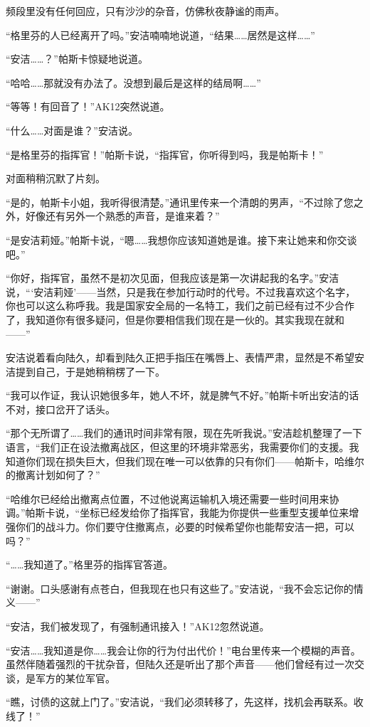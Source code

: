 频段里没有任何回应，只有沙沙的杂音，仿佛秋夜静谧的雨声。

“格里芬的人已经离开了吗。”安洁喃喃地说道，“结果……居然是这样……”

“安洁……？”帕斯卡惊疑地说道。

“哈哈……那就没有办法了。没想到最后是这样的结局啊……”

“等等！有回音了！”AK12突然说道。

“什么……对面是谁？”安洁说。

“是格里芬的指挥官！”帕斯卡说，“指挥官，你听得到吗，我是帕斯卡！”

对面稍稍沉默了片刻。

“是的，帕斯卡小姐，我听得很清楚。”通讯里传来一个清朗的男声，“不过除了您之外，好像还有另外一个熟悉的声音，是谁来着？”

“是安洁莉娅。”帕斯卡说，“嗯……我想你应该知道她是谁。接下来让她来和你交谈吧。”

“你好，指挥官，虽然不是初次见面，但我应该是第一次讲起我的名字。”安洁说，“‘安洁莉娅’——当然，只是我在参加行动时的代号。不过我喜欢这个名字，你也可以这么称呼我。我是国家安全局的一名特工，我们之前已经有过不少合作了，我知道你有很多疑问，但是你要相信我们现在是一伙的。其实我现在就和——”

安洁说着看向陆久，却看到陆久正把手指压在嘴唇上、表情严肃，显然是不希望安洁提到自己，于是她稍稍楞了一下。

“我可以作证，我认识她很多年，她人不坏，就是脾气不好。”帕斯卡听出安洁的话不对，接口岔开了话头。

“那个无所谓了……我们的通讯时间非常有限，现在先听我说。”安洁趁机整理了一下语言，“我们正在设法撤离战区，但这里的环境非常恶劣，我需要你们的支援。我知道你们现在损失巨大，但我们现在唯一可以依靠的只有你们——帕斯卡，哈维尔的撤离计划如何了？”

“哈维尔已经给出撤离点位置，不过他说离运输机入境还需要一些时间用来协调。”帕斯卡说，“坐标已经发给你了指挥官，我能为你提供一些重型支援单位来增强你们的战斗力。你们要守住撤离点，必要的时候希望你也能帮安洁一把，可以吗？”

“……我知道了。”格里芬的指挥官答道。

“谢谢。口头感谢有点苍白，但我现在也只有这些了。”安洁说，“我不会忘记你的情义——”

“安洁，我们被发现了，有强制通讯接入！”AK12忽然说道。

“安洁……我知道是你……我会让你的行为付出代价！”电台里传来一个模糊的声音。虽然伴随着强烈的干扰杂音，但陆久还是听出了那个声音——他们曾经有过一次交谈，是军方的某位军官。

“瞧，讨债的这就上门了。”安洁说，“我们必须转移了，先这样，找机会再联系。收线了！”

